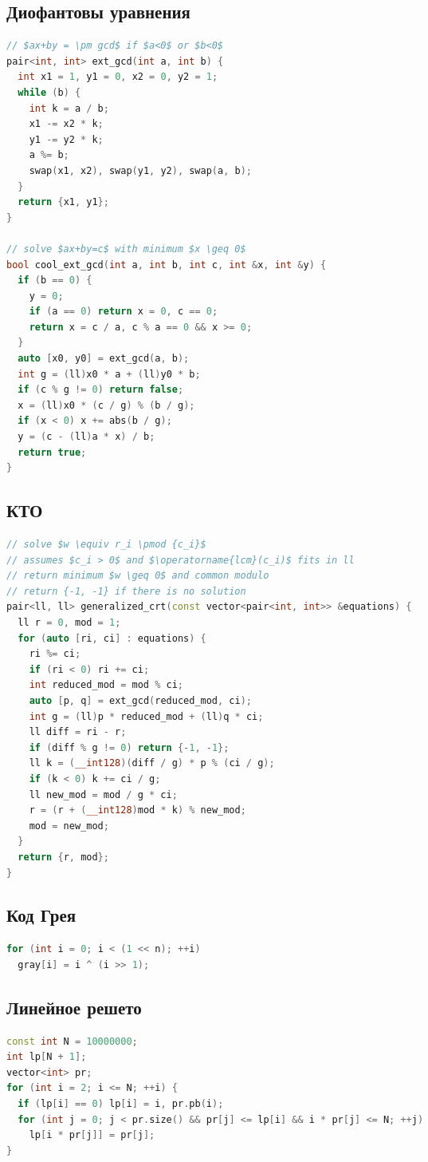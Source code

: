\documentclass[8pt,a4paper,landscape,twosided]{extarticle}
\begin{document}
\begin{multicols*}{3}
\subsection{Диофантовы уравнения}
\begin{lstlisting}[language=C++]
// $ax+by = \pm gcd$ if $a<0$ or $b<0$
pair<int, int> ext_gcd(int a, int b) {
  int x1 = 1, y1 = 0, x2 = 0, y2 = 1;
  while (b) {
    int k = a / b;
    x1 -= x2 * k;
    y1 -= y2 * k;
    a %= b;
    swap(x1, x2), swap(y1, y2), swap(a, b);
  }
  return {x1, y1};
}

// solve $ax+by=c$ with minimum $x \geq 0$
bool cool_ext_gcd(int a, int b, int c, int &x, int &y) {
  if (b == 0) {
    y = 0;
    if (a == 0) return x = 0, c == 0;
    return x = c / a, c % a == 0 && x >= 0;
  }
  auto [x0, y0] = ext_gcd(a, b);
  int g = (ll)x0 * a + (ll)y0 * b;
  if (c % g != 0) return false;
  x = (ll)x0 * (c / g) % (b / g);
  if (x < 0) x += abs(b / g);
  y = (c - (ll)a * x) / b;
  return true;
}
\end{lstlisting}

\subsection{КТО}
\begin{lstlisting}[language=C++]
// solve $w \equiv r_i \pmod {c_i}$
// assumes $c_i > 0$ and $\operatorname{lcm}(c_i)$ fits in ll
// return minimum $w \geq 0$ and common modulo
// return {-1, -1} if there is no solution
pair<ll, ll> generalized_crt(const vector<pair<int, int>> &equations) {
  ll r = 0, mod = 1;
  for (auto [ri, ci] : equations) {
    ri %= ci;
    if (ri < 0) ri += ci;
    int reduced_mod = mod % ci;
    auto [p, q] = ext_gcd(reduced_mod, ci);
    int g = (ll)p * reduced_mod + (ll)q * ci;
    ll diff = ri - r;
    if (diff % g != 0) return {-1, -1};
    ll k = (__int128)(diff / g) * p % (ci / g);
    if (k < 0) k += ci / g;
    ll new_mod = mod / g * ci;
    r = (r + (__int128)mod * k) % new_mod;
    mod = new_mod;
  }
  return {r, mod};
}
\end{lstlisting}

\subsection{Код Грея}
\begin{lstlisting}[language=C++]
for (int i = 0; i < (1 << n); ++i)
  gray[i] = i ^ (i >> 1);
\end{lstlisting}

\subsection{Линейное решето}
\begin{lstlisting}[language=C++]
const int N = 10000000;
int lp[N + 1];
vector<int> pr;
for (int i = 2; i <= N; ++i) {
  if (lp[i] == 0) lp[i] = i, pr.pb(i);
  for (int j = 0; j < pr.size() && pr[j] <= lp[i] && i * pr[j] <= N; ++j)
    lp[i * pr[j]] = pr[j];
}
\end{lstlisting}


\end{multicols*}
\end{document}
